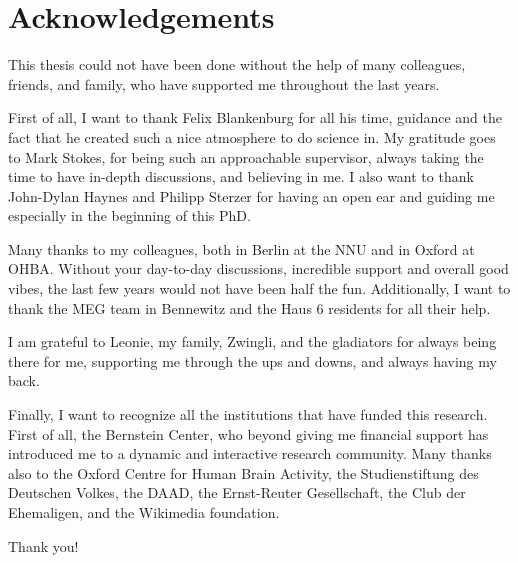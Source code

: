 
\chapter*{Acknowledgements}
\doublespacing
This thesis could not have been done without the help of many colleagues, friends, and family, who have supported me throughout the last years. 

First of all, I want to thank Felix Blankenburg for all his time, guidance and the fact that he created such a nice atmosphere to do science in. My gratitude goes to Mark Stokes, for being such an approachable supervisor, always taking the time to have in-depth discussions, and believing in me. I also want to thank John-Dylan Haynes and Philipp Sterzer for having an open ear and guiding me especially in the beginning of this PhD.

Many thanks to my colleagues, both in Berlin at the NNU and in Oxford at OHBA. Without your day-to-day discussions, incredible support and overall good vibes, the last few years would not have been half the fun.
Additionally, I want to thank the MEG team in Bennewitz and the Haus 6 residents for all their help.

I am grateful to Leonie, my family, Zwingli, and the gladiators for always being there for me, supporting me through the ups and downs, and always having my back.

Finally, I want to recognize all the institutions that have funded this research. First of all, the Bernstein Center, who beyond giving me financial support has introduced me to a dynamic and interactive research community. Many thanks also to the Oxford Centre for Human Brain Activity, the Studienstiftung des Deutschen Volkes, the DAAD, the Ernst-Reuter Gesellschaft, the Club der Ehemaligen, and the Wikimedia foundation. 

Thank you!
